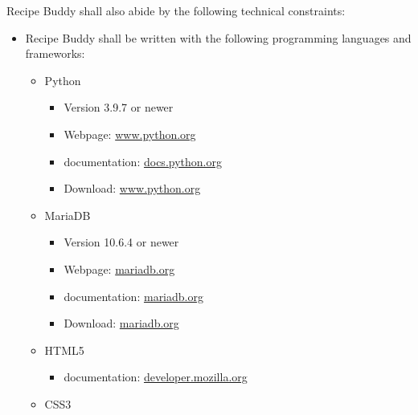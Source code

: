 \documentclass{scrreprt}
\begin{document}
\gls{Recipe Buddy} shall also abide by the following technical constraints:
\begin{itemize}
    \item \gls{Recipe Buddy} shall be written with the following programming languages and frameworks:
    \begin{itemize}

        \item \gls{Python}
        \begin{itemize}

            \item Version 3.9.7 or newer
            \item Webpage: \href{https://www.python.org/}{www.python.org}
            \item \Gls{documentation}: \href{https://docs.python.org/3.9/}{docs.python.org}
            \item Download: \href{https://www.python.org/downloads/release/python-397/}{www.python.org}

        \end{itemize}

        \item \gls{MariaDB}
        \begin{itemize}

            \item Version 10.6.4 or newer
            \item Webpage: \href{https://mariadb.org/}{mariadb.org}
            \item \Gls{documentation}: \href{https://mariadb.com/kb/en/}{mariadb.org}
            \item Download: \href{https://mariadb.org/download/?tab=mariadb&release=10.6.4&product=mariadb}{mariadb.org}
        
        \end{itemize}
        
        \item \gls{HTML}5
        \begin{itemize}
        
            \item \Gls{documentation}: \href{https://developer.mozilla.org/en-US/docs/Web/HTML}{developer.mozilla.org}
        
        \end{itemize}
        
        \item \gls{CSS}3
        \begin{itemize}
        

\end{itemize}
\end{itemize}
\end{itemize}
\end{document}
